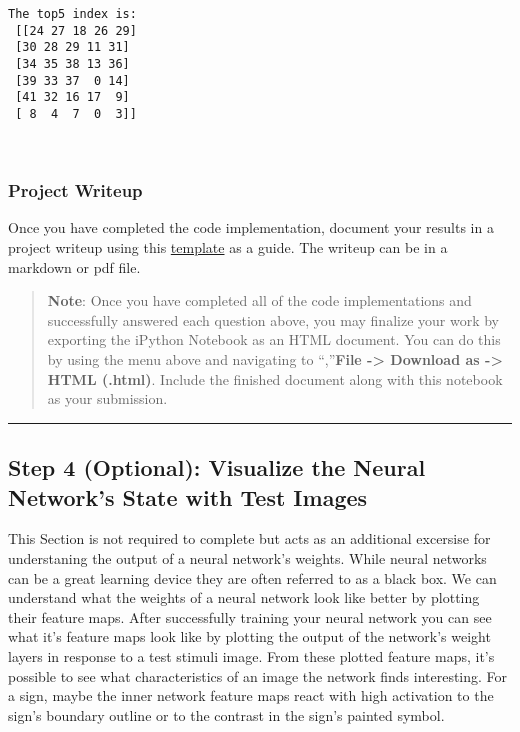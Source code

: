 \documentclass[11pt]{article}
\begin{document}
    \begin{Verbatim}[commandchars=\\\{\}]
The top5 index is:
 [[24 27 18 26 29]
 [30 28 29 11 31]
 [34 35 38 13 36]
 [39 33 37  0 14]
 [41 32 16 17  9]
 [ 8  4  7  0  3]]

    \end{Verbatim}

    \begin{center}
    \end{center}
    { \hspace*{\fill} \\}
    
    \hypertarget{project-writeup}{%
\subsubsection{Project Writeup}\label{project-writeup}}

Once you have completed the code implementation, document your results
in a project writeup using this
\href{https://github.com/udacity/CarND-Traffic-Sign-Classifier-Project/blob/master/writeup_template.md}{template}
as a guide. The writeup can be in a markdown or pdf file.

    \begin{quote}
\textbf{Note}: Once you have completed all of the code implementations
and successfully answered each question above, you may finalize your
work by exporting the iPython Notebook as an HTML document. You can do
this by using the menu above and navigating to \n``,''\textbf{File
-\textgreater{} Download as -\textgreater{} HTML (.html)}. Include the
finished document along with this notebook as your submission.
\end{quote}

    \begin{center}\rule{0.5\linewidth}{\linethickness}\end{center}

\hypertarget{step-4-optional-visualize-the-neural-networks-state-with-test-images}{%
\subsection{Step 4 (Optional): Visualize the Neural Network's State with
Test
Images}\label{step-4-optional-visualize-the-neural-networks-state-with-test-images}}

This Section is not required to complete but acts as an additional
excersise for understaning the output of a neural network's weights.
While neural networks can be a great learning device they are often
referred to as a black box. We can understand what the weights of a
neural network look like better by plotting their feature maps. After
successfully training your neural network you can see what it's feature
maps look like by plotting the output of the network's weight layers in
response to a test stimuli image. From these plotted feature maps, it's
possible to see what characteristics of an image the network finds
interesting. For a sign, maybe the inner network feature maps react with
high activation to the sign's boundary outline or to the contrast in the
sign's painted symbol.
\end{document}
